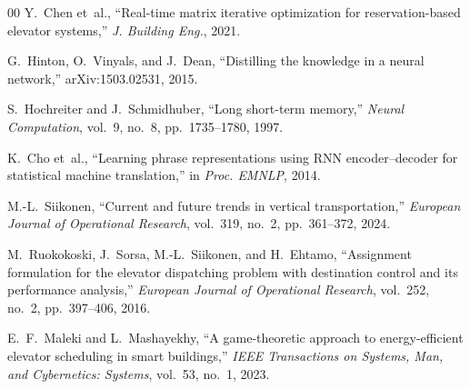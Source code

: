 \documentclass{ieeeaccess}
\begin{document}
\begin{thebibliography}{00}
Y.~Chen et~al., ``Real-time matrix iterative optimization for
reservation-based elevator systems,'' \textit{J. Building Eng.},
2021.

G.~Hinton, O.~Vinyals, and J.~Dean, ``Distilling the knowledge in a
neural network,'' arXiv:1503.02531, 2015.

S.~Hochreiter and J.~Schmidhuber, ``Long short-term memory,''
\textit{Neural Computation}, vol.~9, no.~8, pp.~1735--1780, 1997.

K.~Cho et~al., ``Learning phrase representations using RNN
encoder--decoder for statistical machine translation,'' in
\textit{Proc. EMNLP}, 2014.


M.-L.~Siikonen, ``Current and future trends in vertical
transportation,'' \textit{European Journal of Operational Research},
vol.~319, no.~2, pp.~361--372, 2024.

M.~Ruokokoski, J.~Sorsa, M.-L.~Siikonen, and H.~Ehtamo,
``Assignment formulation for the elevator dispatching problem with
destination control and its performance analysis,'' \textit{European
Journal of Operational Research}, vol.~252, no.~2, pp.~397--406,
2016.

E.~F.~Maleki and L.~Mashayekhy, ``A game-theoretic approach to
energy-efficient elevator scheduling in smart buildings,''
\textit{IEEE Transactions on Systems, Man, and Cybernetics:
Systems}, vol.~53, no.~1, 2023.

\end{thebibliography}
\EOD
\end{document}
